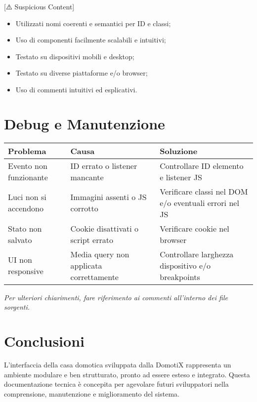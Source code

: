 [⚠️ Suspicious Content] \documentclass[a4paper,12pt]{article}
\begin{document}
\begin{itemize}
  \item Utilizzati nomi coerenti e semantici per ID e classi;
  \item Uso di componenti facilmente scalabili e intuitivi;
  \item Testato su dispositivi mobili e desktop;
  \item Testato su diverse piattaforme e/o browser;
  \item Uso di commenti intuitivi ed esplicativi.
\end{itemize}

\section{Debug e Manutenzione}

\begin{tabular}{|p{5cm}|p{5cm}|p{5cm}|}
\hline
\textbf{Problema} & \textbf{Causa} & \textbf{Soluzione} \\
\hline
Evento non funzionante & ID errato o listener mancante & Controllare ID elemento e listener JS \\
\hline
Luci non si accendono & Immagini assenti o JS corrotto & Verificare classi nel DOM e/o eventuali errori nel JS \\
\hline
Stato non salvato & Cookie disattivati o script errato & Verificare cookie nel browser \\
\hline
UI non responsive & Media query non applicata correttamente & Controllare larghezza dispositivo e/o breakpoints \\
\hline
\end{tabular}

\vspace{0.8cm}
\textit{Per ulteriori chiarimenti, fare riferimento ai commenti all'interno dei file sorgenti.}

\section{Conclusioni}

L'interfaccia della casa domotica sviluppata dalla DomotiX rappresenta un ambiente modulare e ben strutturato, pronto ad essere esteso e integrato. Questa documentazione tecnica è concepita per agevolare futuri sviluppatori nella comprensione, manutenzione e miglioramento del sistema.
\end{document}
